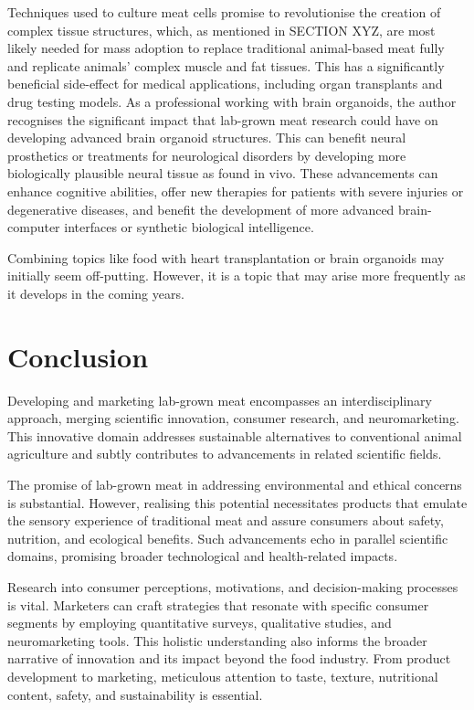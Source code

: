 \documentclass[10pt]{article}
\begin{document}
\begin{sloppypar}

  Techniques used to culture meat cells promise to revolutionise the creation of complex tissue structures, which, as mentioned in SECTION XYZ, are most likely needed for mass adoption to replace traditional animal-based meat fully and replicate animals’ complex muscle and fat tissues. This has a significantly beneficial side-effect for medical applications, including organ transplants and drug testing models. As a professional working with brain organoids, the author recognises the significant impact that lab-grown meat research could have on developing advanced brain organoid structures. This can benefit neural prosthetics or treatments for neurological disorders by developing more biologically plausible neural tissue as found in vivo. These advancements can enhance cognitive abilities, offer new therapies for patients with severe injuries or degenerative diseases, and benefit the development of more advanced brain-computer interfaces or synthetic biological intelligence.

  Combining topics like food with heart transplantation or brain organoids may initially seem off-putting. However, it is a topic that may arise more frequently as it develops in the coming years.

  \section{Conclusion}
  \label{sec:conclusion}
  Developing and marketing lab-grown meat encompasses an interdisciplinary approach, merging scientific innovation, consumer research, and neuromarketing. This innovative domain addresses sustainable alternatives to conventional animal agriculture and subtly contributes to advancements in related scientific fields.

  The promise of lab-grown meat in addressing environmental and ethical concerns is substantial. However, realising this potential necessitates products that emulate the sensory experience of traditional meat and assure consumers about safety, nutrition, and ecological benefits. Such advancements echo in parallel scientific domains, promising broader technological and health-related impacts.

  Research into consumer perceptions, motivations, and decision-making processes is vital. Marketers can craft strategies that resonate with specific consumer segments by employing quantitative surveys, qualitative studies, and neuromarketing tools. This holistic understanding also informs the broader narrative of innovation and its impact beyond the food industry. From product development to marketing, meticulous attention to taste, texture, nutritional content, safety, and sustainability is essential.


\end{sloppypar}
\end{document}
